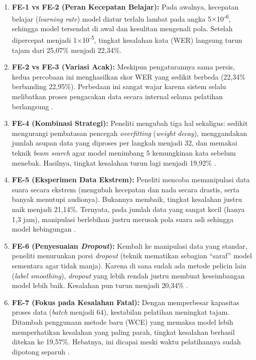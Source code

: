 \begin{enumerate}
    \item \textbf{FE-1 vs FE-2 (Peran Kecepatan Belajar):} Pada awalnya, kecepatan belajar (\textit{learning rate}) model diatur terlalu lambat pada angka 5$\times$10\textsuperscript{-6}, sehingga model tersendat di awal dan kesulitan mengenali pola. Setelah dipercepat menjadi 1$\times$10\textsuperscript{-5}, tingkat kesalahan kata (WER) langsung turun tajam dari 25,07\% menjadi 22,34\%.

    \item \textbf{FE-2 vs FE-3 (Variasi Acak):} Meskipun pengaturannya sama persis, kedua percobaan ini menghasilkan skor WER yang sedikit berbeda (22,34\% berbanding 22,95\%). Perbedaan ini sangat wajar karena sistem selalu melibatkan proses pengacakan data secara internal selama pelatihan berlangsung \cite{kohavi1995crossvalidation}.

    \item \textbf{FE-4 (Kombinasi Strategi):} Peneliti mengubah tiga hal sekaligus: sedikit mengurangi pembatasan pencegah \textit{overfitting} (\textit{weight decay}), menggandakan jumlah asupan data yang diproses per langkah menjadi 32, dan memakai teknik \textit{beam search} agar model menimbang 5 kemungkinan kata sebelum menebak. Hasilnya, tingkat kesalahan turun lagi menjadi 19,92\% \cite{radford2023whisper}.

    \item \textbf{FE-5 (Eksperimen Data Ekstrem):} Peneliti mencoba memanipulasi data suara secara ekstrem (mengubah kecepatan dan nada secara drastis, serta banyak menutupi audionya). Bukannya membaik, tingkat kesalahan justru naik menjadi 21,14\%. Ternyata, pada jumlah data yang sangat kecil (hanya 1,3 jam), manipulasi berlebihan justru merusak pola suara asli sehingga model kebingungan \cite{park2019specaugment, ko2015audio}.

    \item \textbf{FE-6 (Penyesuaian \textit{Dropout}):} Kembali ke manipulasi data yang standar, peneliti menurunkan porsi \textit{dropout} (teknik mematikan sebagian ``saraf'' model sementara agar tidak manja). Karena di sana sudah ada metode pelicin lain (\textit{label smoothing}), \textit{dropout} yang lebih rendah justru membuat keseimbangan model lebih baik. Kesalahan pun turun menjadi 20,34\% \cite{srivastava2014dropout, szegedy2016rethinking}.

    \item \textbf{FE-7 (Fokus pada Kesalahan Fatal):} Dengan memperbesar kapasitas proses data (\textit{batch} menjadi 64), kestabilan pelatihan meningkat tajam. Ditambah penggunaan metode baru (WCE) yang memaksa model lebih memperhatikan kesalahan yang paling parah, tingkat kesalahan berhasil ditekan ke 19,57\%. Hebatnya, ini dicapai meski waktu pelatihannya sudah dipotong separuh \cite{pineiromartin2024weighted}.


\end{enumerate}
